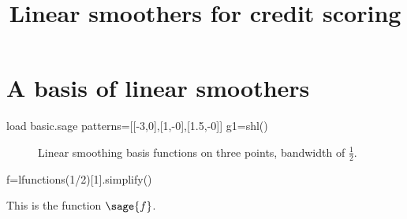 \documentclass[11pt, reqno]{amsart}
\begin{document}
\title{Linear smoothers for credit scoring}
\maketitle

\section*{A basis of linear smoothers}

\begin{sagesilent}
load basic.sage
patterns=[[-3,0],[1,-0],[1.5,-0]]
g1=shl()
\end{sagesilent}

\begin{figure}[h]
  \centering 
  \caption{Linear smoothing basis functions on three points, bandwidth of $\frac{1}{2}$.}
\end{figure}

\begin{sageblock}
f=lfunctions(1/2)[1].simplify()
\end{sageblock}

This is the function $\sage{f}$.
\end{document}
